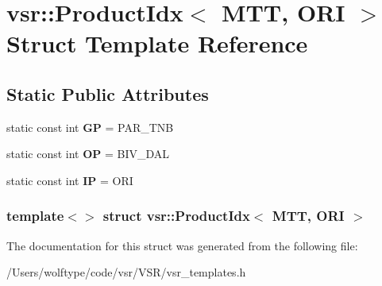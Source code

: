 \hypertarget{structvsr_1_1_product_idx_3_01_m_t_t_00_01_o_r_i_01_4}{\section{vsr\-:\-:Product\-Idx$<$ M\-T\-T, O\-R\-I $>$ Struct Template Reference}
\label{structvsr_1_1_product_idx_3_01_m_t_t_00_01_o_r_i_01_4}
}
\subsection*{Static Public Attributes}
\begin{DoxyCompactItemize}
\item 
\hypertarget{structvsr_1_1_product_idx_3_01_m_t_t_00_01_o_r_i_01_4_a3c97659e2285bd6dccbff779321b62c7}{static const int {\bfseries G\-P} = P\-A\-R\-\_\-\-T\-N\-B}\label{structvsr_1_1_product_idx_3_01_m_t_t_00_01_o_r_i_01_4_a3c97659e2285bd6dccbff779321b62c7}

\item 
\hypertarget{structvsr_1_1_product_idx_3_01_m_t_t_00_01_o_r_i_01_4_a10a46ad8fad22f513de0722a1f4e6b26}{static const int {\bfseries O\-P} = B\-I\-V\-\_\-\-D\-A\-L}\label{structvsr_1_1_product_idx_3_01_m_t_t_00_01_o_r_i_01_4_a10a46ad8fad22f513de0722a1f4e6b26}

\item 
\hypertarget{structvsr_1_1_product_idx_3_01_m_t_t_00_01_o_r_i_01_4_ab1a0c9051e78306d4d26582f22338ec6}{static const int {\bfseries I\-P} = O\-R\-I}\label{structvsr_1_1_product_idx_3_01_m_t_t_00_01_o_r_i_01_4_ab1a0c9051e78306d4d26582f22338ec6}

\end{DoxyCompactItemize}
\subsubsection*{template$<$$>$ struct vsr\-::\-Product\-Idx$<$ M\-T\-T, O\-R\-I $>$}



The documentation for this struct was generated from the following file\-:\begin{DoxyCompactItemize}
\item 
/\-Users/wolftype/code/vsr/\-V\-S\-R/vsr\-\_\-templates.\-h\end{DoxyCompactItemize}
